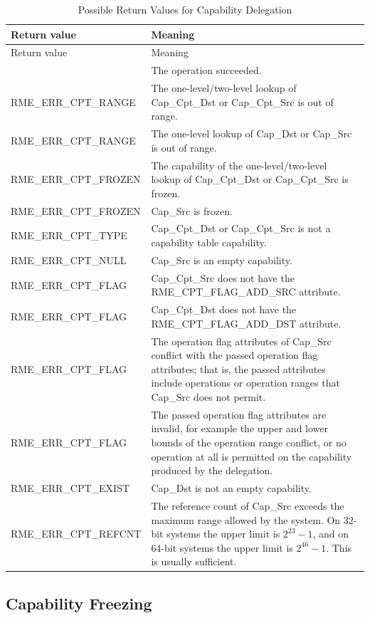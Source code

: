 \begin{xltabular}{\textwidth}{@{}>{\hsize\raggedright\arraybackslash}X>{\hsize\raggedright\arraybackslash}X@{}}
\caption{Possible Return Values for Capability Delegation}\label{tab:2-10-capability-transfer-return-values}\\
\toprule
Return value & Meaning\tabularnewline
\endfirsthead
\toprule
Return value & Meaning\tabularnewline
\midrule
\endhead
\bottomrule
{} & The operation succeeded.\tabularnewline
    RME\_ERR\_CPT\_RANGE & The one-level/two-level lookup of Cap\_Cpt\_Dst or Cap\_Cpt\_Src is out of range.\tabularnewline
    RME\_ERR\_CPT\_RANGE & The one-level lookup of Cap\_Dst or Cap\_Src is out of range.\tabularnewline
    RME\_ERR\_CPT\_FROZEN & The capability of the one-level/two-level lookup of Cap\_Cpt\_Dst or Cap\_Cpt\_Src is frozen.\tabularnewline
    RME\_ERR\_CPT\_FROZEN & Cap\_Src is frozen.\tabularnewline
    RME\_ERR\_CPT\_TYPE & Cap\_Cpt\_Dst or Cap\_Cpt\_Src is not a capability table capability.\tabularnewline
    RME\_ERR\_CPT\_NULL & Cap\_Src is an empty capability.\tabularnewline
    RME\_ERR\_CPT\_FLAG & Cap\_Cpt\_Src does not have the RME\_CPT\_FLAG\_ADD\_SRC attribute.\tabularnewline
    RME\_ERR\_CPT\_FLAG & Cap\_Cpt\_Dst does not have the RME\_CPT\_FLAG\_ADD\_DST attribute.\tabularnewline
    RME\_ERR\_CPT\_FLAG & The operation flag attributes of Cap\_Src conflict with the passed operation flag attributes; that is, the passed attributes include operations or operation ranges that Cap\_Src does not permit.\tabularnewline
    RME\_ERR\_CPT\_FLAG & The passed operation flag attributes are invalid, for example the upper and lower bounds of the operation range conflict, or no operation at all is permitted on the capability produced by the delegation.\tabularnewline
    RME\_ERR\_CPT\_EXIST & Cap\_Dst is not an empty capability.\tabularnewline
    RME\_ERR\_CPT\_REFCNT & The reference count of Cap\_Src exceeds the maximum range allowed by the system. On 32-bit systems the upper limit is $2^{23}-1$, and on 64-bit systems the upper limit is $2^{46}-1$. This is usually sufficient.\tabularnewline
\end{xltabular}
\nopagebreak[4]

\subsection{Capability Freezing}\label{subsec:2-freeze-a-capability}
\nopagebreak[4]

